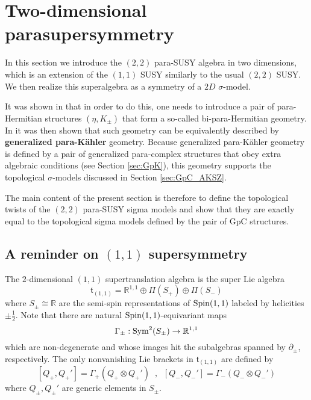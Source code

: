 \documentclass{article}
\newcommand{\RR}{\mathbb{R}}
\theoremstyle{definition}
\theoremstyle{remark}
\begin{document}
\section{Two-dimensional parasupersymmetry}  \label{sec: parasusy}

In this section we introduce the $(2,2)$ para-SUSY algebra in two dimensions, which is an extension of the $(1,1)$ SUSY similarly to the usual $(2,2)$ SUSY. We then realize this superalgebra as a symmetry of a $2D$ $\sigma$-model.

It was shown in \cite{HullTwistedSUSY} that in order to do this, one needs to introduce a pair of para-Hermitian structures $(\eta,K_\pm)$ that form a so-called bi-para-Hermitian geometry. In \cite{Hu:2019zro} it was then shown that such geometry can be equivalently described by {\bf generalized para-K\"ahler} geometry. Because generalized para-K\"ahler geometry is defined by a pair of generalized para-complex structures that obey extra algebraic conditions (see Section \ref{sec:GpK}), this geometry supports the topological $\sigma$-models discussed in Section \ref{sec:GpC_AKSZ}.

The main content of the present section is therefore to define the topological twists of the $(2,2)$ para-SUSY sigma models and show that they are exactly equal to the topological sigma models defined by the pair of GpC structures.
%
%

\subsection{A reminder on $(1,1)$ supersymmetry}

The $2$-dimensional $(1,1)$ supertranslation algebra is the super Lie algebra
\[
\mathfrak{t}_{(1,1)} = \RR^{1,1} \oplus \Pi (S_+) \oplus \Pi(S_-)
\]
where $S_\pm \cong \RR$ are the semi-spin representations of ${\rm Spin}(1,1)$ labeled by helicities $\pm \frac{1}{2}$. 
Note that there are natural ${\rm Spin}(1,1)$-equivariant maps
\[
\Gamma_{\pm} : {\rm Sym}^2(S_\pm) \to \RR^{1,1}
\]
which are non-degenerate and whose images hit the subalgebras spanned by $\partial_{\pm}$, respectively. 
The only nonvanishing Lie brackets in $\mathfrak{t}_{(1,1)}$ are defined by
\[
[Q_+, Q_+'] = \Gamma_+(Q_+ \otimes Q_+') \;\; , \;\; [Q_-, Q_-'] = \Gamma_-(Q_- \otimes Q_-')
\]  
where $Q_\pm, Q_\pm'$ are generic elements in $S_\pm$. 
\end{document}
